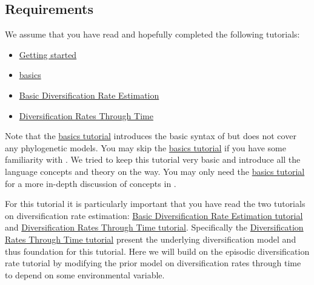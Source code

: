 \subsection{Requirements}
We assume that you have read and hopefully completed the following tutorials:
\begin{itemize}
\item \href{https://github.com/revbayes/revbayes_tutorial/raw/master/tutorial_TeX/RB_Getting_Started/RB_Getting_Started.pdf}{Getting started}
\item \href{https://github.com/revbayes/revbayes_tutorial/raw/master/tutorial_TeX/RB_Basics_Tutorial/RB_Basics_Tutorial.pdf}{\Rev basics}
\item \href{https://github.com/revbayes/revbayes_tutorial/raw/master/tutorial_TeX/RB_DiversificationRate_Tutorial/RB_DiversificationRate_Tutorial.pdf}{Basic Diversification Rate Estimation}
\item \href{https://github.com/revbayes/revbayes_tutorial/raw/master/tutorial_TeX/RB_DiversificationRate_Episodic_Tutorial/RB_DiversificationRate_Episodic_Tutorial.pdf}{Diversification Rates Through Time}
\end{itemize}
Note that the \href{https://github.com/revbayes/revbayes_tutorial/raw/master/tutorial_TeX/RB_Basics_Tutorial/RB_Basics_Tutorial.pdf}{\Rev basics tutorial} introduces the basic syntax of \Rev but does not cover any phylogenetic models.
You may skip the \href{https://github.com/revbayes/revbayes_tutorial/raw/master/tutorial_TeX/RB_Basics_Tutorial/RB_Basics_Tutorial.pdf}{\Rev basics tutorial} if you have some familiarity with \R.
We tried to keep this tutorial very basic and introduce all the language concepts and theory on the way.
You may only need the \href{https://github.com/revbayes/revbayes_tutorial/raw/master/tutorial_TeX/RB_Basics_Tutorial/RB_Basics_Tutorial.pdf}{\Rev basics tutorial} for a more in-depth discussion of concepts in \Rev.

For this tutorial it is particularly important that you have read the two tutorials on diversification rate estimation: \href{https://github.com/revbayes/revbayes_tutorial/raw/master/tutorial_TeX/RB_DiversificationRate_Tutorial/RB_DiversificationRate_Tutorial.pdf}{Basic Diversification Rate Estimation tutorial} and \href{https://github.com/revbayes/revbayes_tutorial/raw/master/tutorial_TeX/RB_DiversificationRate_Episodic_Tutorial/RB_DiversificationRate_Episodic_Tutorial.pdf}{Diversification Rates Through Time tutorial}.
Specifically the \href{https://github.com/revbayes/revbayes_tutorial/raw/master/tutorial_TeX/RB_DiversificationRate_Episodic_Tutorial/RB_DiversificationRate_Episodic_Tutorial.pdf}{Diversification Rates Through Time tutorial} present the underlying diversification model and thus foundation for this tutorial.
Here we will build on the episodic diversification rate tutorial by modifying the prior model on diversification rates through time to depend on some environmental variable.

